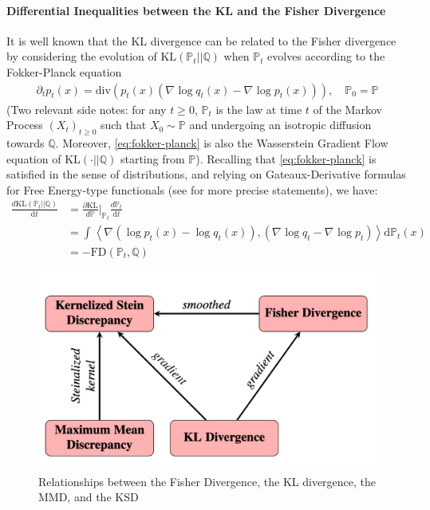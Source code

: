 \documentclass{uai2023} %
\begin{document}
\paragraph{Differential Inequalities between the KL and the Fisher Divergence} 
It is well known \cite{carrillo2003kinetic} that the KL divergence can be related to the Fisher divergence
by considering the evolution of $ \text{KL}(\mathbb{ P }_t||\mathbb{ Q }) $
when $ \mathbb{ P }_t $ evolves according to the Fokker-Planck equation
\begin{equation} \label{eq:fokker-planck}
\begin{aligned}
\partial_t p_t(x) = \text{div} ( p_t(x) (\nabla_{  } \log q_t(x) - \nabla_{  }  \log p_t(x)  )), \quad \mathbb P_0=\mathbb P
\end{aligned}
\end{equation}
(Two relevant side notes: for any $t\geq 0$, $\mathbb P_t$ is the law at time $t$ of the Markov Process $(X_t)_{t\geq 0}$ such that $X_0 \sim \mathbb P$ and undergoing an isotropic diffusion towards $\mathbb Q$. Moreover, \cref{eq:fokker-planck} is also the Wasserstein Gradient Flow equation of $\textrm{KL}(\cdot||\mathbb Q)$ starting from $\mathbb  P$).
Recalling that \cref{eq:fokker-planck} is satisfied in the sense of distributions,
and relying on Gateaux-Derivative formulas for Free Energy-type functionals
(see \cite{ambrosio2005gradient} for more precise statements), we have:
\begin{equation*}
\begin{aligned}
    \frac{ d \text{KL}(\mathbb P_t || \mathbb Q) }{ \text{d}t } &= \frac{ \partial \text{KL} }{ d \mathbb{ P } }\bigg\rvert_{\mathbb{ P }_t} \frac{ d \mathbb{ P }_t }{ \text{d}t } \\
				      &= \int_{ }^{  } \left \langle  \nabla_{  } (\log p_t(x) - \log q_t(x) ), (\nabla_{  }  \log q_t - \nabla_{  }  \log p_t  )\right \rangle  \text{d}\mathbb{ P }_t(x) \\
				      &= - \text{FD}(\mathbb{ P }_t, \mathbb{ Q })
\end{aligned}
\end{equation*}

\begin{figure}[htbp]
    \begin{center}
    \includegraphics[width=.7\textwidth]{fd_ksd_mmd_kl.png} %
    \end{center}
    \label{fig:link-divergences}
    \caption{Relationships between the Fisher Divergence, the KL divergence, the MMD, and the KSD \cite{liu2016short}}
\end{figure}
\end{document}
